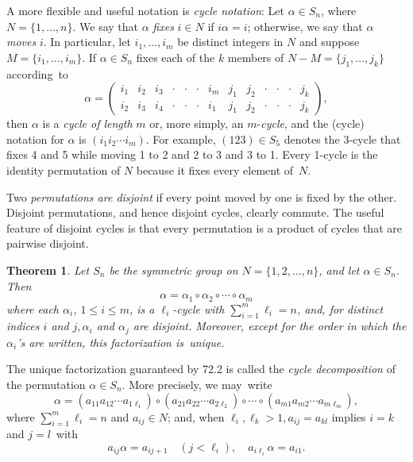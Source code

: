 \documentclass{surv-l}
\numberwithin{equation}{section}
\numberwithin{table}{section}
\numberwithin{figure}{section}
\theoremstyle{plain}
\newtheorem{theorem}[equation]{Theorem}
\theoremstyle{definition}
\begin{document}
A more flexible and useful notation is \emph{cycle notation}: Let
$\alpha\in S_{n}$, where $N=\{1,\ldots, n\}$. We say that $\alpha$
\emph{fixes} $i\in N$ if $i\alpha=i$; otherwise, we say that
$\alpha$ \emph{moves} $i$. In particular, let $i_{1},\ldots,
i_{m}$ be distinct integers in $N$ and suppose $M=\{i_{1},\ldots,
i_{m}\}$. If $\alpha\in S_{n}$ fixes each of the $k$ members of
$N-M=\{j_{1},\ldots, j_{k}\}$ according~to
\[
\alpha=\left(\begin{array}{ccccccccccccc}
i_{1} & i_{2} & i_{3} &\cdot &\cdot &\cdot & i_{m} & j_{1} & j_{2} &\cdot &\cdot &\cdot & j_{k}\\
i_{2} & i_{3} & i_{4} &\cdot &\cdot &\cdot & i_{1} & j_{1} & j_{2} &\cdot &\cdot &\cdot & j_{k}
\end{array}\right),
\]
then $\alpha$ is a \emph{cycle of length}
$m$ or, more simply, an $m$-\emph{cycle}, and the (cycle) notation
for $\alpha$ is $(i_{1}i_{2}\cdots i_{m})$. For example, $(123)
\in S_{5}$ denotes the 3-cycle that fixes 4 and 5 while moving 1
to 2 and 2 to 3 and 3 to 1. Every 1-cycle is the identity
permutation of $N$ because it fixes every element of~$N$.

Two \emph{permutations are disjoint} if every point moved by one is fixed by the other.
Disjoint permutations, and hence disjoint cycles, clearly commute.
The useful feature of disjoint cycles is that every permutation is
a product of cycles that are pairwise disjoint.

\begin{theorem}\label{thmA.72.2}
Let $S_{n}$ be the symmetric group on $N=\{1,2,\ldots, n\}$,
and let $\alpha\in S_{n}$. Then
\[
\alpha=\alpha_{1}\circ \alpha_{2}\circ \cdots \circ\alpha_{m}
\]
where each $\alpha_{i}$, $1\leq i\leq m$, is a $\ell_{i}$-cycle
with $\sum_{i=1}^{m}\ell_{i}=n$, and, for distinct indices $i$
and $j, \alpha_{i}$ and $\alpha_{j}$ are disjoint. Moreover,
except for the order in which the $\alpha_{i}$'s are written,
this factorization is~unique.
\end{theorem}

The unique factorization guaranteed by 72.2 is called the
\emph{cycle decomposition} of the permutation $\alpha\in S_{n}$.
More precisely, we may~write
\begin{equation}\label{eqA.72.3}
 \alpha=(a_{11}a_{12}\cdots a_{1\ell_{1}})\circ(a_{21}a_{22}\cdots a_{2\ell_{2}})\circ\cdots \circ (a_{m1}a_{m2}\cdots a_{m\ell_{m}}),
\end{equation}
where $\sum_{i=1}^{m}\ell_{i}=n$ and $a_{ij}\in N$; and, when
$\ell_{i}, \ell_{k}>1, a_{ij}=a_{kl}$ implies $i=k$ and
$j=l$~with
\[
a_{ij}\alpha=a_{ij+1}\quad (j<\ell_{i}),\quad a_{i\ell_{i}}\alpha=a_{i1}.
\]
\end{document}

